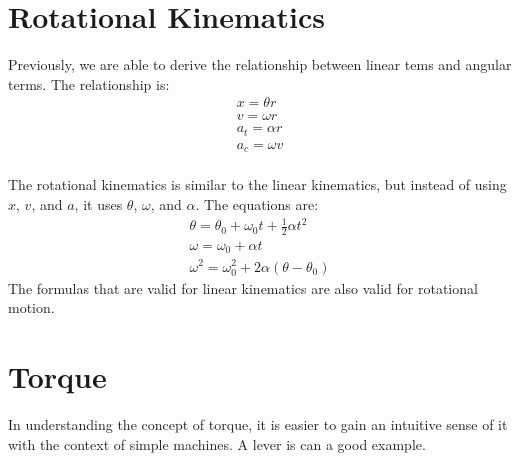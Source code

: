 \documentclass[]{article}
\begin{document}
    \section{Rotational Kinematics}
        Previously, we are able to derive the relationship between linear
        tems and angular terms. The relationship is:
        \begin{gather*}
            x = \theta r\\
            v = \omega r\\
            a_t = \alpha r\\
            a_c = \omega v\\
        \end{gather*}

        The rotational kinematics is similar to the linear kinematics, but
        instead of using $x$, $v$, and $a$, it uses $\theta$, $\omega$, and
        $\alpha$. The equations are:
        \begin{gather*}
            \theta = \theta_0 + \omega_0 t + \frac{1}{2} \alpha t^2\\
            \omega = \omega_0 + \alpha t\\
            \omega^2 = \omega_0^2 + 2\alpha(\theta - \theta_0)
        \end{gather*}
        The formulas that are valid for linear kinematics are also valid for
        rotational motion.
    \section{Torque}
        In understanding the concept of torque, it is easier to gain an
        intuitive sense of it with the context of simple machines. A lever
        is can a good example.
\end{document}
